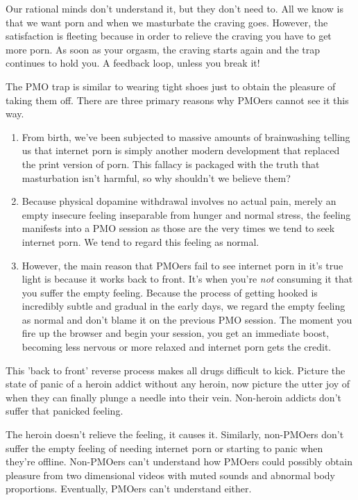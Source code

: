 \documentclass[easypeasy.tex]{subfiles}
\begin{document}
Our rational minds don't understand it, but they don't need to. All we know is that we want porn and when we masturbate the craving goes. However, the satisfaction is fleeting because in order to relieve the craving you have to get more porn. As soon as your orgasm, the craving starts again and the trap continues to hold you. A feedback loop, unless you break it!

The PMO trap is similar to wearing tight shoes just to obtain the pleasure of taking them off. There are three primary reasons why PMOers cannot see it this way.

\begin{enumerate}
  \item From birth, we've been subjected to massive amounts of brainwashing telling us that internet porn is simply another modern development that replaced the print version of porn. This fallacy is packaged with the truth that masturbation isn't harmful, so why shouldn't we believe them?

  \item Because physical dopamine withdrawal involves no actual pain, merely an empty insecure feeling inseparable from hunger and normal stress, the feeling manifests into a PMO session as those are the very times we tend to seek internet porn. We tend to regard this feeling as normal.

  \item However, the main reason that PMOers fail to see internet porn in it's true light is because it works back to front. It's when you're \textit{not} consuming it that you suffer the empty feeling. Because the process of getting hooked is incredibly subtle and gradual in the early days, we regard the empty feeling as normal and don't blame it on the previous PMO session. The moment you fire up the browser and begin your session, you get an immediate boost, becoming less nervous or more relaxed and internet porn gets the credit.
  \end{enumerate}

This 'back to front' reverse process makes all drugs difficult to kick. Picture the state of panic of a heroin addict without any heroin, now picture the utter joy of when they can finally plunge a needle into their vein. Non-heroin addicts don't suffer that panicked feeling.

The heroin doesn't relieve the feeling, it causes it. Similarly, non-PMOers don't suffer the empty feeling of needing internet porn or starting to panic when they're offline. Non-PMOers can't understand how PMOers could possibly obtain pleasure from two dimensional videos with muted sounds and abnormal body proportions. Eventually, PMOers can't understand either.
\end{document}

